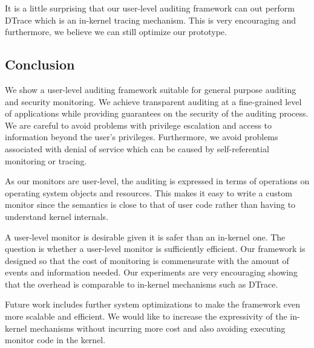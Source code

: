 It is a little surprising that our user-level auditing framework
can out perform DTrace which is an in-kernel tracing mechanism.
This is very encouraging and furthermore, 
we believe we can still optimize our prototype.

\subsection{Conclusion}

We show a user-level auditing framework suitable for general purpose
auditing and security monitoring. 
We achieve transparent auditing
at a fine-grained level of applications while providing guarantees
on the security of the auditing process. We are careful to avoid problems
with privilege escalation and access to information beyond the user's
privileges. Furthermore, we avoid problems associated with denial of
service which can be caused by self-referential monitoring or tracing.

As our monitors are user-level, the auditing is expressed in terms
of operations on operating system objects and resources. This makes it
easy to write a custom monitor since the semantics is close to that
of user code rather than having to understand kernel internals.

A user-level monitor is desirable given it is safer than an in-kernel one.
The question is whether a user-level monitor is sufficiently efficient. 
Our framework is designed so that the cost of monitoring
is commensurate with the amount of events and information needed.
Our experiments are very encouraging 
showing that the overhead is comparable to in-kernel 
mechanisms such as DTrace.

Future work includes further system optimizations to make the framework
even more scalable and efficient. We would like to increase the
expressivity of the in-kernel mechanisms without incurring more cost
and also avoiding executing monitor code in the kernel.

